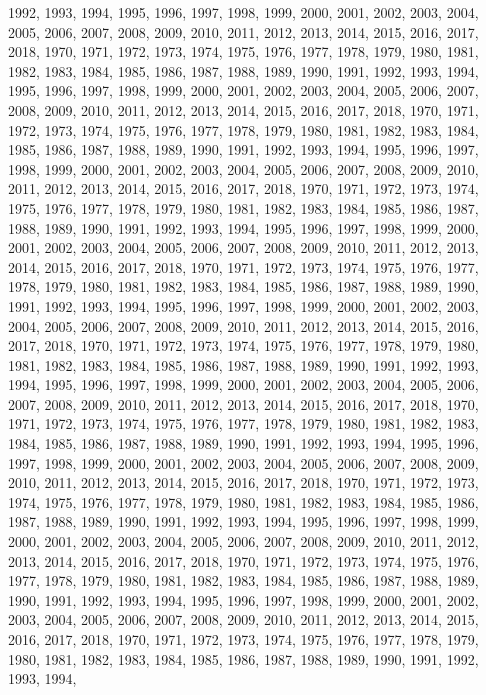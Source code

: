 \documentclass[
]{article}
\begin{document}
1992, 1993, 1994, 1995, 1996, 1997, 1998, 1999, 2000, 2001, 2002, 2003,
2004, 2005, 2006, 2007, 2008, 2009, 2010, 2011, 2012, 2013, 2014, 2015,
2016, 2017, 2018, 1970, 1971, 1972, 1973, 1974, 1975, 1976, 1977, 1978,
1979, 1980, 1981, 1982, 1983, 1984, 1985, 1986, 1987, 1988, 1989, 1990,
1991, 1992, 1993, 1994, 1995, 1996, 1997, 1998, 1999, 2000, 2001, 2002,
2003, 2004, 2005, 2006, 2007, 2008, 2009, 2010, 2011, 2012, 2013, 2014,
2015, 2016, 2017, 2018, 1970, 1971, 1972, 1973, 1974, 1975, 1976, 1977,
1978, 1979, 1980, 1981, 1982, 1983, 1984, 1985, 1986, 1987, 1988, 1989,
1990, 1991, 1992, 1993, 1994, 1995, 1996, 1997, 1998, 1999, 2000, 2001,
2002, 2003, 2004, 2005, 2006, 2007, 2008, 2009, 2010, 2011, 2012, 2013,
2014, 2015, 2016, 2017, 2018, 1970, 1971, 1972, 1973, 1974, 1975, 1976,
1977, 1978, 1979, 1980, 1981, 1982, 1983, 1984, 1985, 1986, 1987, 1988,
1989, 1990, 1991, 1992, 1993, 1994, 1995, 1996, 1997, 1998, 1999, 2000,
2001, 2002, 2003, 2004, 2005, 2006, 2007, 2008, 2009, 2010, 2011, 2012,
2013, 2014, 2015, 2016, 2017, 2018, 1970, 1971, 1972, 1973, 1974, 1975,
1976, 1977, 1978, 1979, 1980, 1981, 1982, 1983, 1984, 1985, 1986, 1987,
1988, 1989, 1990, 1991, 1992, 1993, 1994, 1995, 1996, 1997, 1998, 1999,
2000, 2001, 2002, 2003, 2004, 2005, 2006, 2007, 2008, 2009, 2010, 2011,
2012, 2013, 2014, 2015, 2016, 2017, 2018, 1970, 1971, 1972, 1973, 1974,
1975, 1976, 1977, 1978, 1979, 1980, 1981, 1982, 1983, 1984, 1985, 1986,
1987, 1988, 1989, 1990, 1991, 1992, 1993, 1994, 1995, 1996, 1997, 1998,
1999, 2000, 2001, 2002, 2003, 2004, 2005, 2006, 2007, 2008, 2009, 2010,
2011, 2012, 2013, 2014, 2015, 2016, 2017, 2018, 1970, 1971, 1972, 1973,
1974, 1975, 1976, 1977, 1978, 1979, 1980, 1981, 1982, 1983, 1984, 1985,
1986, 1987, 1988, 1989, 1990, 1991, 1992, 1993, 1994, 1995, 1996, 1997,
1998, 1999, 2000, 2001, 2002, 2003, 2004, 2005, 2006, 2007, 2008, 2009,
2010, 2011, 2012, 2013, 2014, 2015, 2016, 2017, 2018, 1970, 1971, 1972,
1973, 1974, 1975, 1976, 1977, 1978, 1979, 1980, 1981, 1982, 1983, 1984,
1985, 1986, 1987, 1988, 1989, 1990, 1991, 1992, 1993, 1994, 1995, 1996,
1997, 1998, 1999, 2000, 2001, 2002, 2003, 2004, 2005, 2006, 2007, 2008,
2009, 2010, 2011, 2012, 2013, 2014, 2015, 2016, 2017, 2018, 1970, 1971,
1972, 1973, 1974, 1975, 1976, 1977, 1978, 1979, 1980, 1981, 1982, 1983,
1984, 1985, 1986, 1987, 1988, 1989, 1990, 1991, 1992, 1993, 1994, 1995,
1996, 1997, 1998, 1999, 2000, 2001, 2002, 2003, 2004, 2005, 2006, 2007,
2008, 2009, 2010, 2011, 2012, 2013, 2014, 2015, 2016, 2017, 2018, 1970,
1971, 1972, 1973, 1974, 1975, 1976, 1977, 1978, 1979, 1980, 1981, 1982,
1983, 1984, 1985, 1986, 1987, 1988, 1989, 1990, 1991, 1992, 1993, 1994,
\end{document}
